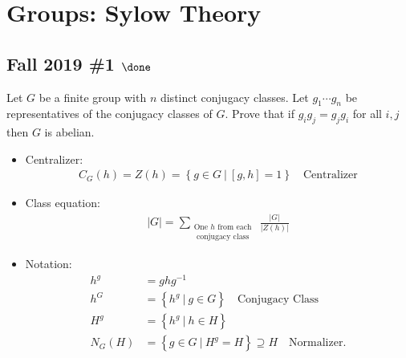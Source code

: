 \hypertarget{groups-sylow-theory}{%
\section{Groups: Sylow Theory}\label{groups-sylow-theory}}

\hypertarget{fall-2019-1-done}{%
\subsection{\texorpdfstring{Fall 2019 \#1
\(\done\)}{Fall 2019 \#1 \textbackslash done}}\label{fall-2019-1-done}}

Let \(G\) be a finite group with \(n\) distinct conjugacy classes. Let
\(g_1 \cdots g_n\) be representatives of the conjugacy classes of \(G\).
Prove that if \(g_i g_j = g_j g_i\) for all \(i, j\) then \(G\) is
abelian.

\begin{concept}

\envlist

\begin{itemize}
\tightlist
\item
  Centralizer:
  \begin{align*}
  C_G(h) = Z(h) = \left\{{g\in G {~\mathrel{\Big|}~}[g,h] = 1}\right\}
  \quad\text{Centralizer}
  \end{align*}
\item
  Class equation:
  \begin{align*}
  {\left\lvert {G} \right\rvert} = \sum_{\substack{\text{One $h$ from each } \\ \text{ conjugacy class}}} \frac{{\left\lvert {G} \right\rvert}}{{\left\lvert {Z(h)} \right\rvert}}
  \end{align*}
\item
  Notation:
  \begin{align*}
  h^g &= ghg^{-1}\\
  h^G &= \left\{{ h^g {~\mathrel{\Big|}~}g\in G}\right\} \quad\text{Conjugacy Class}\\
  H^g &= \left\{{h^g {~\mathrel{\Big|}~}h\in H}\right\} \\
  N_G(H) &= \left\{{g\in G {~\mathrel{\Big|}~}H^g = H}\right\} \supseteq H \quad\text{Normalizer}
  .\end{align*}
\end{itemize}

\end{concept}

